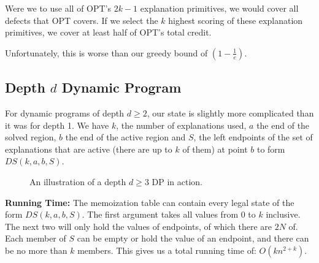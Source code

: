 \documentclass[11pt,twocolumn]{article}
\begin{document}
Were we to use all of OPT's $2k-1$ explanation primitives, we would cover all defects that OPT covers.  If we select the $k$ highest scoring of these explanation primitives, we cover at least half of OPT's total credit.

Unfortunately, this is worse than our greedy bound of $(1- \frac{1}{e})$.

\subsection{Depth $d$ Dynamic Program} \label{sec:dpFixedDepth}

For dynamic programs of depth $d \geq 2$, our state is slightly more complicated than it was for depth 1. We have $k$, the number of explanations used, $a$ the end of the solved region, $b$ the end of the active region and $S$, the left endpoints of the set of explanations that are active (there are up to $k$ of them) at point $b$ to form $DS(k,a,b,S)$.


\begin{figure}[ht!]
\caption{An illustration of a depth $d \geq 3$ DP in action.}
\label{fig:dpIllustration}
\end{figure}

\FloatBarrier

{\bf Running Time:} The memoization table can contain every legal state of the form $DS(k,a,b,S)$.  The first argument takes all values from 0 to $k$ inclusive.  The next two will only hold the values of endpoints, of which there are $2N$ of.  Each member of $S$ can be empty or hold the value of an endpoint, and there can be no more than $k$ members.  This gives us a total running time of: $O(kn^{2+k})$.
\end{document}
